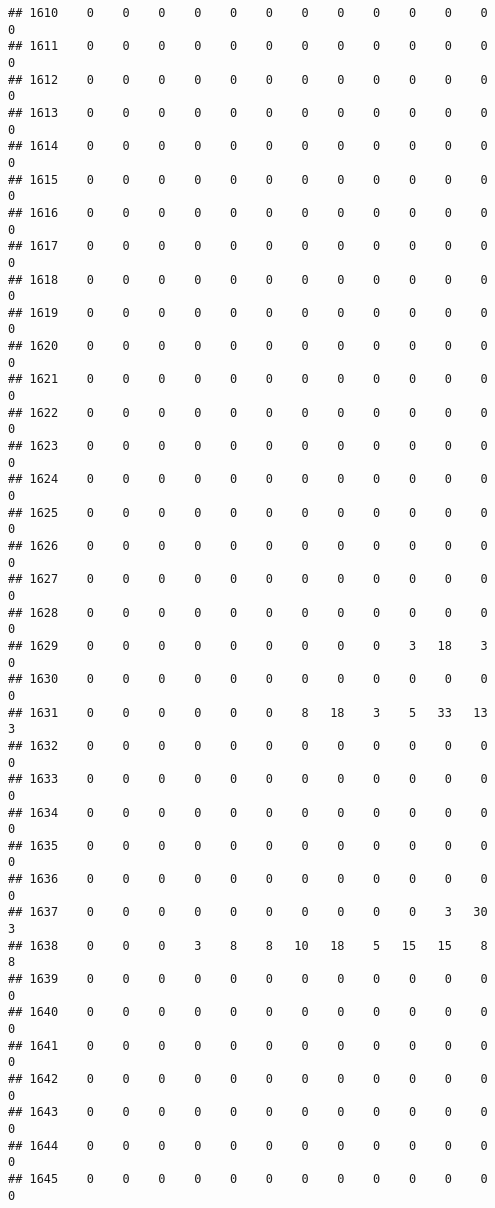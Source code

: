\documentclass[]{article}
\begin{document}
\begin{verbatim}
## 1610    0    0    0    0    0    0    0    0    0    0    0    0    0
## 1611    0    0    0    0    0    0    0    0    0    0    0    0    0
## 1612    0    0    0    0    0    0    0    0    0    0    0    0    0
## 1613    0    0    0    0    0    0    0    0    0    0    0    0    0
## 1614    0    0    0    0    0    0    0    0    0    0    0    0    0
## 1615    0    0    0    0    0    0    0    0    0    0    0    0    0
## 1616    0    0    0    0    0    0    0    0    0    0    0    0    0
## 1617    0    0    0    0    0    0    0    0    0    0    0    0    0
## 1618    0    0    0    0    0    0    0    0    0    0    0    0    0
## 1619    0    0    0    0    0    0    0    0    0    0    0    0    0
## 1620    0    0    0    0    0    0    0    0    0    0    0    0    0
## 1621    0    0    0    0    0    0    0    0    0    0    0    0    0
## 1622    0    0    0    0    0    0    0    0    0    0    0    0    0
## 1623    0    0    0    0    0    0    0    0    0    0    0    0    0
## 1624    0    0    0    0    0    0    0    0    0    0    0    0    0
## 1625    0    0    0    0    0    0    0    0    0    0    0    0    0
## 1626    0    0    0    0    0    0    0    0    0    0    0    0    0
## 1627    0    0    0    0    0    0    0    0    0    0    0    0    0
## 1628    0    0    0    0    0    0    0    0    0    0    0    0    0
## 1629    0    0    0    0    0    0    0    0    0    3   18    3    0
## 1630    0    0    0    0    0    0    0    0    0    0    0    0    0
## 1631    0    0    0    0    0    0    8   18    3    5   33   13    3
## 1632    0    0    0    0    0    0    0    0    0    0    0    0    0
## 1633    0    0    0    0    0    0    0    0    0    0    0    0    0
## 1634    0    0    0    0    0    0    0    0    0    0    0    0    0
## 1635    0    0    0    0    0    0    0    0    0    0    0    0    0
## 1636    0    0    0    0    0    0    0    0    0    0    0    0    0
## 1637    0    0    0    0    0    0    0    0    0    0    3   30    3
## 1638    0    0    0    3    8    8   10   18    5   15   15    8    8
## 1639    0    0    0    0    0    0    0    0    0    0    0    0    0
## 1640    0    0    0    0    0    0    0    0    0    0    0    0    0
## 1641    0    0    0    0    0    0    0    0    0    0    0    0    0
## 1642    0    0    0    0    0    0    0    0    0    0    0    0    0
## 1643    0    0    0    0    0    0    0    0    0    0    0    0    0
## 1644    0    0    0    0    0    0    0    0    0    0    0    0    0
## 1645    0    0    0    0    0    0    0    0    0    0    0    0    0

\end{verbatim}
\end{document}
